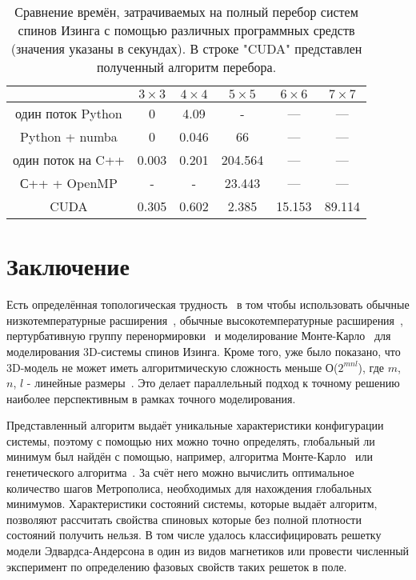 \documentclass[10pt]{article}
\begin{document}
	\begin{table}[h]
		\begin{center}
			\label{Time_Table}
			\caption{Сравнение времён, затрачиваемых на полный перебор систем спинов Изинга с помощью различных программных средств (значения указаны в секундах). В строке "CUDA" представлен полученный алгоритм перебора.}
			\begin{tabular}{|c|c|c|c|c|c|}
				\hline
				& $3 \times 3$ & $4 \times 4$ & $5 \times 5$ & $6 \times 6$ & $7 \times 7$  \\ \hline
				один поток Python & 0            & 4.09         & -            & ---          & ---           \\ \hline
				Python + numba    & 0            & 0.046        & 66           & ---          & ---           \\ \hline
				один поток на C++ & 0.003        & 0.201        & 204.564      & ---          & ---           \\ \hline
				С++ + OpenMP      & -            & -            & 23.443       & ---          & ---           \\ \hline
				CUDA              & 0.305        & 0.602        & 2.385        & 15.153       & 89.114        \\ \hline
			\end{tabular}
		\end{center}
	\end{table}
	
	\section*{Заключение}
	Есть определённая топологическая трудность~\cite{zhang2018topological} в том чтобы использовать обычные низкотемпературные расширения~\cite{katz2007mathematics}, обычные высокотемпературные расширения~\cite{zhang2013mathematical}, пертурбативную группу перенормировки~\cite{zhang2016mathematical} и моделирование Монте-Карло~\cite{zhang2017nature} для моделирования 3D-системы спинов Изинга. Кроме того, уже было показано, что 3D-модель не может иметь алгоритмическую сложность меньше О($2^{mnl}$), где $m$, $n$, $l$ - линейные размеры~\cite{zhang2020computational}. Это делает параллельный подход к точному решению наиболее перспективным в рамках точного моделирования.
	
	Представленный алгоритм выдаёт уникальные характеристики конфигурации системы, поэтому с помощью них можно точно определять, глобальный ли минимум был найдён с помощью, например, алгоритма Монте-Карло~\cite{janke2008monte} или генетического алгоритма~\cite{Panchenko2007}. За счёт него можно вычислить оптимальное количество шагов Метрополиса, необходимых для нахождения глобальных минимумов. Характеристики состояний системы, которые выдаёт алгоритм, позволяют рассчитать свойства спиновых которые без полной плотности состояний получить нельзя. В том числе удалось классифицировать решетку модели Эдвардса-Андерсона в один из видов магнетиков или провести численный эксперимент по определению фазовых свойств таких решеток в поле.
	
\end{document}
